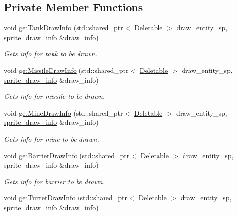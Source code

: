 \subsection*{Private Member Functions}
\begin{DoxyCompactItemize}
\item 
void \hyperlink{classDrawManager_a450157950bdd23c27bc5dcdafdaa3101}{get\-Tank\-Draw\-Info} (std\-::shared\-\_\-ptr$<$ \hyperlink{classDeletable}{Deletable} $>$ draw\-\_\-entity\-\_\-sp, \hyperlink{structsprite__draw__info}{sprite\-\_\-draw\-\_\-info} \&draw\-\_\-info)
\begin{DoxyCompactList}\small\item\em Gets info for tank to be drawn. \end{DoxyCompactList}\item 
void \hyperlink{classDrawManager_ae85d0a7a0c8b6c2a3abb0a617d8599ea}{get\-Missile\-Draw\-Info} (std\-::shared\-\_\-ptr$<$ \hyperlink{classDeletable}{Deletable} $>$ draw\-\_\-entity\-\_\-sp, \hyperlink{structsprite__draw__info}{sprite\-\_\-draw\-\_\-info} \&draw\-\_\-info)
\begin{DoxyCompactList}\small\item\em Gets info for missile to be drawn. \end{DoxyCompactList}\item 
void \hyperlink{classDrawManager_ac82e7f4f521c0a6eda4551c7182b782e}{get\-Mine\-Draw\-Info} (std\-::shared\-\_\-ptr$<$ \hyperlink{classDeletable}{Deletable} $>$ draw\-\_\-entity\-\_\-sp, \hyperlink{structsprite__draw__info}{sprite\-\_\-draw\-\_\-info} \&draw\-\_\-info)
\begin{DoxyCompactList}\small\item\em Gets info for mine to be drawn. \end{DoxyCompactList}\item 
void \hyperlink{classDrawManager_a41ad9837106a08143f5799c2e50535ff}{get\-Barrier\-Draw\-Info} (std\-::shared\-\_\-ptr$<$ \hyperlink{classDeletable}{Deletable} $>$ draw\-\_\-entity\-\_\-sp, \hyperlink{structsprite__draw__info}{sprite\-\_\-draw\-\_\-info} \&draw\-\_\-info)
\begin{DoxyCompactList}\small\item\em Gets info for barrier to be drawn. \end{DoxyCompactList}\item 
void \hyperlink{classDrawManager_ab63c01f42532b275a095c09e0a06cad9}{get\-Turret\-Draw\-Info} (std\-::shared\-\_\-ptr$<$ \hyperlink{classDeletable}{Deletable} $>$ draw\-\_\-entity\-\_\-sp, \hyperlink{structsprite__draw__info}{sprite\-\_\-draw\-\_\-info} \&draw\-\_\-info)

\end{DoxyCompactItemize}
